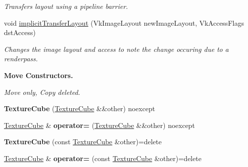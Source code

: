 \begin{DoxyCompactItemize}
\begin{DoxyCompactList}\small\item\em Transfers layout using a pipeline barrier. \end{DoxyCompactList}\item 
void \hyperlink{classblaze_1_1TextureCube_a4eafb0406a5edeebd01d89e325ecf160}{implicit\+Transfer\+Layout} (Vk\+Image\+Layout new\+Image\+Layout, Vk\+Access\+Flags dst\+Access)
\begin{DoxyCompactList}\small\item\em Changes the image layout and access to note the change occuring due to a renderpass. \end{DoxyCompactList}\end{DoxyCompactItemize}
\begin{Indent}\textbf{ Move Constructors.}\par
{\em Move only, Copy deleted. }\begin{DoxyCompactItemize}
\item 
\mbox{\label{classblaze_1_1TextureCube_abdb69c128fd2e704ac84fea3ae4de4da}} 
{\bfseries Texture\+Cube} (\hyperlink{classblaze_1_1TextureCube}{Texture\+Cube} \&\&other) noexcept
\item 
\mbox{\label{classblaze_1_1TextureCube_ab8f643ef1e14690f6f9ff16a86ceff0c}} 
\hyperlink{classblaze_1_1TextureCube}{Texture\+Cube} \& {\bfseries operator=} (\hyperlink{classblaze_1_1TextureCube}{Texture\+Cube} \&\&other) noexcept
\item 
\mbox{\label{classblaze_1_1TextureCube_abd3d8686bbc93d1b61ce231a91dd9334}} 
{\bfseries Texture\+Cube} (const \hyperlink{classblaze_1_1TextureCube}{Texture\+Cube} \&other)=delete
\item 
\mbox{\label{classblaze_1_1TextureCube_ad518187ffe7f305c4dda7b3d37155e85}} 
\hyperlink{classblaze_1_1TextureCube}{Texture\+Cube} \& {\bfseries operator=} (const \hyperlink{classblaze_1_1TextureCube}{Texture\+Cube} \&other)=delete
\end{DoxyCompactItemize}
\end{Indent}
